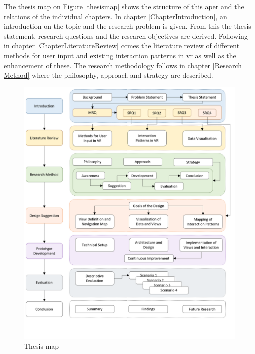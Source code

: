 The thesis map on Figure \ref{thesismap} shows the structure of this aper and the relations of the individual chapters. \newline
In chapter \ref{ChapterIntroduction}, an introduction on the topic and the research problem is given. From this the thesis statement, research questions and the research objectives are derived. Following in chapter \ref{ChapterLiteratureReview} comes the literature review of different methods for user input and existing interaction patterns in \gls{vr} as well as the enhancement of these.
The research methodology follows in chapter \ref{Research Method} where the philosophy, approach and strategy are described.
\begin{figure}[t!]
	\begin{center}
		\includegraphics[width=14cm]{03_Figures/06_Introduction/ThesisMap.png}
		\caption[Thesis Map]{Thesis map}
		\label{fig:thesismap}
	\end{center}
\end{figure}






